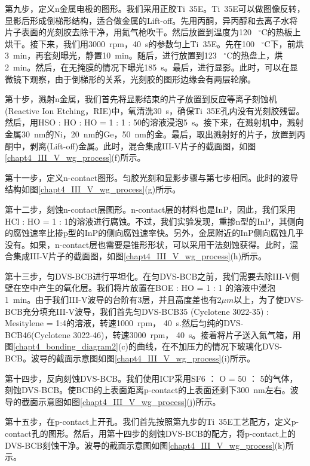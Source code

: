 第九步，定义n金属电极的图形。我们采用正胶Ti~35E。Ti~35E可以做图像反转，显影后形成倒梯形结构，适合做金属的Lift-off。先用丙酮，异丙醇和去离子水将片子表面的光刻胶去除干净，用氮气枪吹干。然后放置到温度为120 ~$^{\circ}$C的热板上烘干。接下来，我们用3000~rpm，40~s的参数匀上Ti~35E。先在100 ~$^{\circ}$C下，前烘3~min，再套刻曝光，静置10~min。随后，进行放置到123 ~$^{\circ}$C的热盘上，烘2~min。然后，在无掩膜的情况下曝光185~s。最后，进行显影。此时，可以在显微镜下观察，由于倒梯形的关系，光刻胶的图形边缘会有两层轮廓。

第十步，溅射n金属，我们首先将显影结束的片子放置到反应等离子刻蚀机(Reactive Ion Etching，RIE)中，氧清洗30~s，确保Ti~35E孔内没有光刻胶残留。然后，用HSO : HO : HO = 1 : 1 : 50的溶液浸泡5~s。接下来，在溅射机中，溅射金属30~nm的Ni，20~nm的Ge，50~nm的金。最后，取出溅射好的片子，放置到丙酮中，剥离(Lift-off)金属。此时，混合集成III-V片子的截面图，如图\ref{chapt4_III_V_wg_process}(f)所示。

第十一步，定义n-contact图形。匀胶光刻和显影步骤与第七步相同。此时的波导结构如图\ref{chapt4_III_V_wg_process}(g)所示。

第十二步，刻蚀n-contact层图形。n-contact层的材料也是InP，因此，我们采用HCl : HO = 1 : 1的溶液进行腐蚀。不过，我们实验发现，重掺n型的InP，其侧向的腐蚀速率比掺p型的InP的侧向腐蚀速率快。另外，金属附近的InP侧向腐蚀几乎没有。如果，n-contact层也需要是锥形形状，可以采用干法刻蚀获得。此时，混合集成III-V片子的截面图，如图\ref{chapt4_III_V_wg_process}(h)所示。

第十三步，匀DVS-BCB进行平坦化。在匀DVS-BCB之前，我们需要去除III-V侧壁在空中产生的氧化层。我们将片放置在BOE : HO = 1 : 1 的溶液中浸泡1~min。由于我们III-V波导的台阶有3层，并且高度差也有$2 \mu m$以上，为了使DVS-BCB充分填充III-V波导，我们首先匀DVS-BCB35 (Cyclotene 3022-35)\cite{dvsbcb35} : Mesitylene = 1:4的溶液，转速1000~rpm， 40~s.然后匀纯的DVS-BCB46(Cyclotene 3022-46)\cite{dvsbcb46}，转速3000~rpm， 40~s。接着将片子送入氮气箱，用图\ref{chapt4_bonding_diagram2}(c)的曲线，在不加压力的情况下玻璃化DVS-BCB。波导的截面示意图如图\ref{chapt4_III_V_wg_process}(i)所示。

第十四步，反向刻蚀DVS-BCB。我们使用ICP采用SF6 ： O = 50 ： 5的气体，刻蚀DVS-BCB。使BCB的上表面距离p-contact的上表面还剩下300~nm左右。波导的截面示意图如图\ref{chapt4_III_V_wg_process}(j)所示。

第十五步，在p-contact上开孔。我们首先按照第九步的Ti~35E工艺配方，定义p-contact孔的图形。然后，用第十四步的刻蚀DVS-BCB的配方，将p-contact上的DVS-BCB刻蚀干净。波导的截面示意图如图\ref{chapt4_III_V_wg_process}(k)所示。

